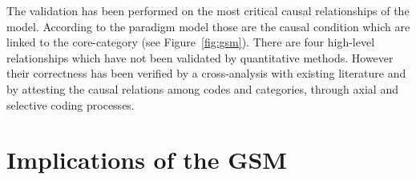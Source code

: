 \documentclass[10pt,journal,letterpaper,compsoc]{IEEEtran}
\begin{document}
The validation has been performed on the most critical causal relationships of
the model. According to the paradigm model those are the causal condition which
are linked to the core-category (see Figure~\ref{fig:gsm}). There are four
high-level relationships which have not been validated by quantitative
methods. However their correctness has been verified by a cross-analysis with
existing literature and by attesting the causal relations among codes and
categories, through axial and selective coding processes.


\section{Implications of the GSM} %
\label{sect:theory:impl}


\end{document}
